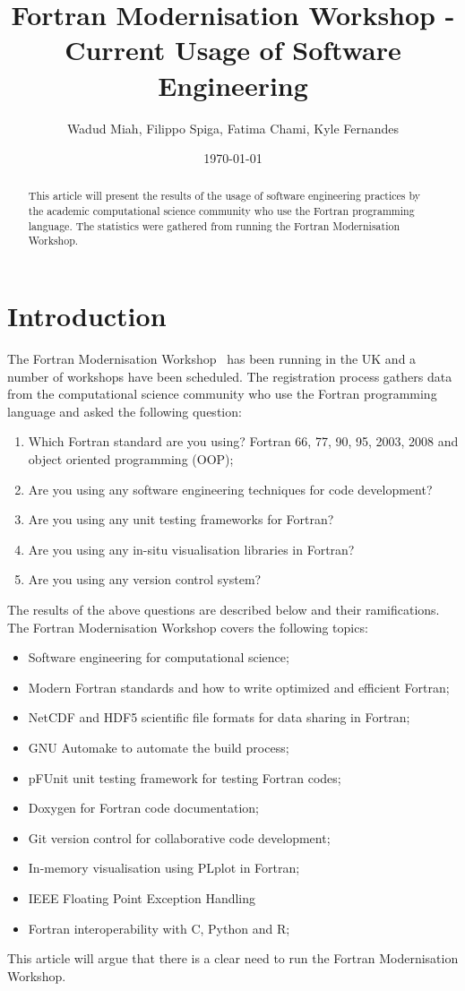 \documentclass[12pt]{article}
\title{\bf Fortran Modernisation Workshop - \\ 
       Current Usage of Software Engineering}
\author{Wadud Miah, Filippo Spiga, Fatima Chami, Kyle Fernandes}
\date{\today}
\begin{document}
\maketitle

\begin{abstract}
This article will present the results of the usage of software engineering
practices by the academic computational science community who use the Fortran
programming language. The statistics were gathered from running
the Fortran Modernisation Workshop. 
\end{abstract}
%
\section{Introduction}
The Fortran Modernisation Workshop~\cite{fmw:nag} has been running in the UK
and a number of workshops have been scheduled. The registration process gathers
data from the computational science community who use the Fortran programming
language and asked the following question:
\begin{enumerate}
\item Which Fortran standard are you using? Fortran 66, 77, 90, 95, 2003, 2008 and
object oriented programming (OOP);
\item Are you using any software engineering techniques for code development?
\item Are you using any unit testing frameworks for Fortran?
\item Are you using any in-situ visualisation libraries in Fortran?
\item Are you using any version control system?
\end{enumerate}
The results of the above questions are described below and their ramifications.
The Fortran Modernisation Workshop covers the following topics:
\begin{itemize}
\item Software engineering for computational science;
\item Modern Fortran standards and how to write optimized and efficient Fortran;
\item NetCDF and HDF5 scientific file formats for data sharing in Fortran;
\item GNU Automake to automate the build process;
\item pFUnit unit testing framework for testing Fortran codes;
\item Doxygen for Fortran code documentation;
\item Git version control for collaborative code development;
\item In-memory visualisation using PLplot in Fortran;
\item IEEE Floating Point Exception Handling
\item Fortran interoperability with C, Python and R;
\end{itemize}
This article will argue that there is a clear need to run the Fortran Modernisation 
Workshop. 
%
\end{document}
